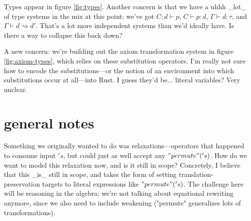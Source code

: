\documentclass{article}
\begin{document}
Types appear in figure \ref{fig:types}. 
Another concern is that we have a uhhh _lot_ of type systems in the mix at this point: 
we've got $C;d ⊢ p$, $C ⊢ p : d$, $Γ ⊢ d : τ$, and $Γ ⊢ d ⇝ d'$.  
That's a lot more independent systems than we'd ideally  have.  Is there a way to collapse this back down? 

A new concern: we're building out the axiom transformation system in figure \ref{fig:axiom-types}, which relies on these substitution operators. I'm really not sure how to encode the substitutions---or the notion of an environment into which substitutions occur at all---into Rust. I guess they'd be... literal variables? Very unclear.


\section{general notes}

Something we originally wanted to do was relaxations---operators that happened to consume input $'s$, but could just as well accept any $"permute"('s)$.  How do we want to model this relaxation now, and is it still in scope? Concretely, I believe that this _is_ still in scope, and takes the form of setting translation-preservation targets to literal expressions like $"permute"('s)$.  The challenge here will be reasoning in the algebra; we're not talking about equational rewriting anymore, since we also need to include weakening ("permute" generalizes lots of transformations). 
\end{document}
